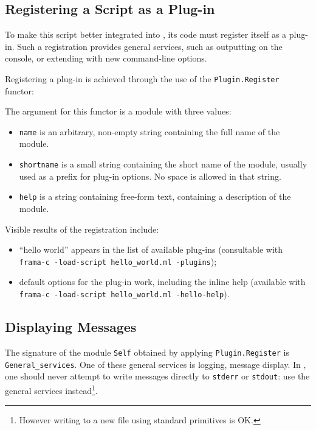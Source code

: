 \subsection{Registering a Script as a Plug-in}\label{tut2:plugin}

To make this script better integrated into \framac, its code must register
itself as a plug-in. Such a registration provides general services, such as
outputting on the \framac console, or extending \framac with new command-line
options.

Registering a plug-in is achieved through the use of the
\texttt{Plugin.Register} functor:


The argument for this functor is a module with three values:
\begin{itemize}
\item \texttt{name} is an arbitrary, non-empty string containing the full name
  of the module.
\item \texttt{shortname} is a small string containing the short name of the
  module, usually used as a prefix for plug-in options. No space is allowed in
  that string.
\item \texttt{help} is a string containing free-form text, containing a
  description of the module.
\end{itemize}

Visible results of the registration include:
\begin{itemize}
\item ``hello world'' appears in the list of available plug-ins
  (consultable with \texttt{frama-c -load-script
    hello\_world.ml -plugins});
\item default options for the plug-in work, including the inline help
  (available with \texttt{frama-c -load-script
    hello\_world.ml -hello-help}).
\end{itemize}

\subsection{Displaying Messages}\label{tut2:messages}

The signature of the module \texttt{Self} obtained by applying
\texttt{Plugin.Register} is \texttt{General\_services}. One of these general
services is logging, \ie message display. In \framac, one should never attempt
to write messages directly to \texttt{stderr} or \texttt{stdout}: use the
general services instead\footnote{However writing to a new file using standard
  \ocaml primitives is OK.}.

